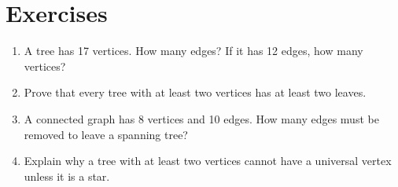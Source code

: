 \section*{Exercises}
\begin{enumerate}
\item A tree has 17 vertices. How many edges? If it has 12 edges, how many vertices?
\item Prove that every tree with at least two vertices has at least two leaves.
\item A connected graph has 8 vertices and 10 edges. How many edges must be removed to leave a spanning tree?
\item Explain why a tree with at least two vertices cannot have a universal vertex unless it is a star.
\end{enumerate}
